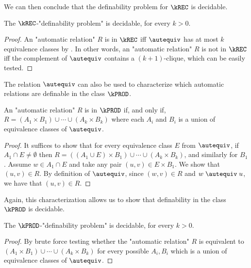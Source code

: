 We can then conclude that the definability problem for $\kREC$ is decidable. 

\begin{corollary}
    The $\kREC$-"definability problem" is decidable, for every $k > 0$.
\end{corollary}
\begin{proof}
    An "automatic relation" $R$ is in $\kREC$ if{f} $\autequiv$ has at most $k$ equivalence classes by . 
    In other words, an "automatic relation" $R$ is not in $\kREC$ if{f} the complement of $\autequiv$ contains a $(k+1)$-clique, which can be easily tested.
\end{proof}

The relation $\autequiv$ can also be used to characterize which automatic relations are definable in the class $\kPROD$.

\begin{lemma}
    An "automatic relation" $R$ is in $\kPROD$ if, and only if, $R=(A_1 \times B_1) \cup \dotsb \cup (A_k \times B_k)$ where each $A_i$ and $B_i$ is a union of equivalence classes of $\autequiv$.
\end{lemma}
\begin{proof}
    It suffices to show that for every equivalence class $E$ from $\autequiv$, if $A_1 \cap E \neq \emptyset$ then $R = ((A_1 \cup E) \times B_1) \cup \dotsb \cup (A_k \times B_k)$, and similarly for $B_1$. Assume $w \in A_1 \cap E$ and take any pair $(u,v) \in E \times B_1$. We show that $(u,v) \in R$. By definition of $\autequiv$, since $(w,v) \in R$ and $w \mathrel{\autequiv} u$, we have that $(u,v) \in R$.
\end{proof}

Again, this characterization allows us to show that definability in the class $\kPROD$ is decidable. 

\begin{corollary}
    The $\kPROD$-"definability problem" is decidable, for every $k > 0$.
\end{corollary}

\begin{proof}
    By brute force testing whether the "automatic relation" $R$ is equivalent to $(A_1 \times B_1) \cup \dotsb \cup (A_k \times B_k)$ for every possible $A_i,B_i$ which is a union of equivalence classes of $\autequiv$.
\end{proof}
